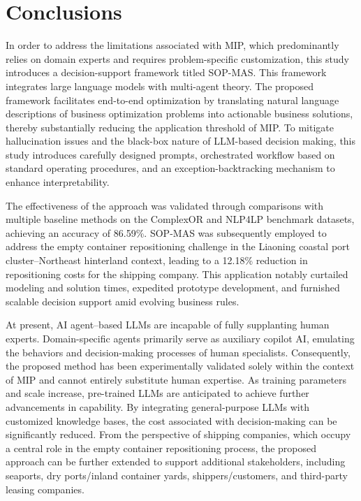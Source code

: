 \documentclass[preprint,12pt]{elsarticle}
\begin{document}
\section{Conclusions}

In order to address the limitations associated with MIP, which predominantly relies on domain experts and requires problem-specific customization, this study introduces a decision-support framework titled SOP-MAS. This framework integrates large language models with multi-agent theory. The proposed framework facilitates end-to-end optimization by translating natural language descriptions of business optimization problems into actionable business solutions, thereby substantially reducing the application threshold of MIP. To mitigate hallucination issues and the black-box nature of LLM-based decision making, this study introduces carefully designed prompts, orchestrated workflow based on standard operating procedures, and an exception-backtracking mechanism to enhance interpretability.

The effectiveness of the approach was validated through comparisons with multiple baseline methods on the ComplexOR and NLP4LP benchmark datasets, achieving an accuracy of 86.59\%. SOP-MAS was subsequently employed to address the empty container repositioning challenge in the Liaoning coastal port cluster–Northeast hinterland context, leading to a 12.18\% reduction in repositioning costs for the shipping company. This application notably curtailed modeling and solution times, expedited prototype development, and furnished scalable decision support amid evolving business rules.

At present, AI agent–based LLMs are incapable of fully supplanting human experts. Domain-specific agents primarily serve as auxiliary copilot AI, emulating the behaviors and decision-making processes of human specialists. Consequently, the proposed method has been experimentally validated solely within the context of MIP and cannot entirely substitute human expertise. As training parameters and scale increase, pre-trained LLMs are anticipated to achieve further advancements in capability. By integrating general-purpose LLMs with customized knowledge bases, the cost associated with decision-making can be significantly reduced. From the perspective of shipping companies, which occupy a central role in the empty container repositioning process, the proposed approach can be further extended to support additional stakeholders, including seaports, dry ports/inland container yards, shippers/customers, and third-party leasing companies.
\end{document}
